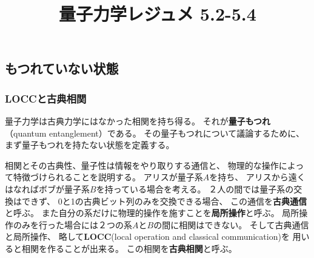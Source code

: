\documentclass[a4paper, 10pt]{jsarticle}
\title{量子力学レジュメ 5.2-5.4}
\author{}
\begin{document}
\maketitle

\setcounter{section}{5}
\setcounter{subsection}{1}

\subsection{もつれていない状態}
\subsubsection{LOCCと古典相関}
量子力学は古典力学にはなかった相関を持ち得る。
それが\textbf{量子もつれ}（quantum entanglement）である。
その量子もつれについて議論するために、
まず量子もつれを持たない状態を定義する。

相関とその古典性、量子性は情報をやり取りする通信と、
物理的な操作によって特徴づけられることを説明する。
アリスが量子系$A$を持ち、
アリスから遠くはなればボブが量子系$B$を持っている場合を考える。
２人の間では量子系の交換はできず、
0と1の古典ビット列のみを交換できる場合、
この通信を\textbf{古典通信}と呼ぶ。
また自分の系だけに物理的操作を施すことを\textbf{局所操作}と呼ぶ。
局所操作のみを行った場合には２つの系$A$と$B$の間に相関はできない。
そして古典通信と局所操作、
略して\textbf{LOCC}(local operation and classical communication)を
用いると相関を作ることが出来る。
この相関を\textbf{古典相関}と呼ぶ。
\end{document}
